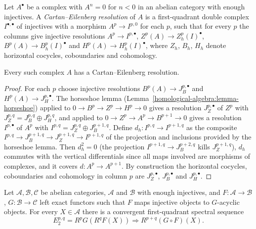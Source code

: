 \begin{definition}\label{homological-algebra:definition-cartan-eilenberg}
Let $A^\bullet$ be a complex with $A^n = 0$ for $n < 0$ in an abelian category with enough injectives. A \emph{Cartan--Eilenberg resolution}
of $A$ is a first-quadrant double complex $I^{\bullet,\bullet}$ of injectives with a morphism $A^p \to I^{p,0}$ for each $p$, such that for every $p$ the
columns give injective resolutions $A^p \to I^{p,\bullet}$, $Z^p(A) \to Z^p_h(I)^\bullet$, $B^p(A) \to B^p_h(I)^\bullet$ and $H^p(A) \to H^p_h(I)^\bullet$, where
$Z_h$, $B_h$, $H_h$ denote horizontal cocycles, coboundaries and cohomology.
\end{definition}

\begin{lemma}\label{homological-algebra:lemma-cartan-eilenberg-exists}
Every such complex $A$ has a Cartan--Eilenberg resolution.
\end{lemma}

\begin{proof}
For each $p$ choose injective resolutions $B^p(A) \to J_B^{p,\bullet}$ and $H^p(A) \to J_H^{p,\bullet}$. The horseshoe lemma
(Lemma~\ref{homological-algebra:lemma-horseshoe}) applied to $0 \to B^p \to Z^p \to H^p \to 0$ gives a resolution $J_Z^{p,\bullet}$ of $Z^p$ with
$J_Z^{p,q} = J_B^{p,q} \oplus J_H^{p,q}$, and applied to $0 \to Z^p \to A^p \to B^{p+1} \to 0$ gives a resolution $I^{p,\bullet}$ of $A^p$ with
$I^{p,q} = J_Z^{p,q} \oplus J_B^{p+1,q}$. Define $d_h \colon I^{p,q} \to I^{p+1,q}$ as the composite
$I^{p,q} \to J_B^{p+1,q} \to J_Z^{p+1,q} \to I^{p+1,q}$ of the projection and inclusions provided by the horseshoe lemma. Then $d_h^2 = 0$ (the
projection $I^{p+1, q} \to J_B^{p+2,q}$ kills $J_Z^{p+1,q}$), $d_h$ commutes with the vertical differentials since all maps involved are morphisms
of complexes, and it covers $d \colon A^p \to A^{p+1}$. By construction the horizontal cocycles, coboundaries and cohomology in column $p$ are
$J_Z^{p,\bullet}$, $J_B^{p,\bullet}$ and $J_H^{p,\bullet}$.
\end{proof}

\begin{theorem}\label{homological-algebra:theorem-grothendieck}
Let $\mathcal{A}, \mathcal{B}, \mathcal{C}$ be abelian categories, $\mathcal{A}$ and $\mathcal{B}$ with enough injectives, and $F \colon \mathcal{A} \to \mathcal{B}$,
$G \colon \mathcal{B} \to \mathcal{C}$ left exact functors such that $F$ maps injective objects to $G$-acyclic objects. For every $X \in \mathcal{A}$ there is a
convergent first-quadrant spectral sequence
\[
E_2^{p,q} = R^pG(R^qF(X)) \Rightarrow R^{p+q}(G \circ F)(X).
\]
\end{theorem}

